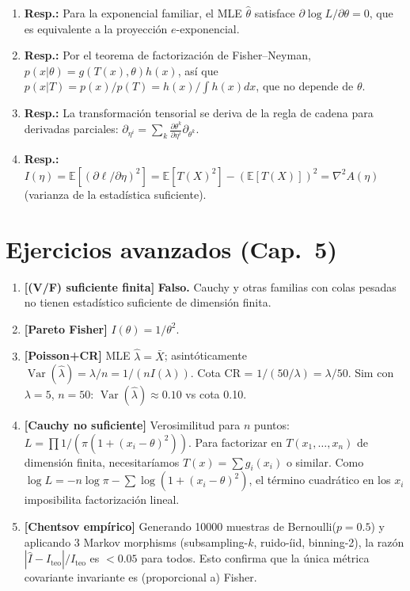 \begin{enumerate}
	\item \textbf{Resp.:} Para la exponencial familiar, el MLE $\hat\theta$ satisface $\partial \log L / \partial \theta = 0$, que es equivalente a la proyección $e$-exponencial.
	\item \textbf{Resp.:} Por el teorema de factorización de Fisher--Neyman, $p(x|\theta) = g(T(x), \theta) h(x)$, así que $p(x|T) = p(x)/p(T) = h(x)/\int h(x)dx$, que no depende de $\theta$.
	\item \textbf{Resp.:} La transformación tensorial se deriva de la regla de cadena para derivadas parciales: $\partial_{\eta^i} = \sum_k \frac{\partial\theta^k}{\partial\eta^i} \partial_{\theta^k}$.
	\item \textbf{Resp.:} $I(\eta) = \mathbb{E}[(\partial \ell / \partial \eta)^2] = \mathbb{E}[T(X)^2] - (\mathbb{E}[T(X)])^2 = \nabla^2 A(\eta)$ (varianza de la estadística suficiente).
\end{enumerate}

\section*{Ejercicios avanzados (Cap.~5)}
\begin{enumerate}
	\item \textbf{[(V/F) suficiente finita]} \textbf{Falso.} Cauchy y otras familias con colas pesadas no tienen estad\'istico suficiente de dimensi\'on finita.
	\item \textbf{[Pareto Fisher]} $I(\theta)=1/\theta^2$.
	\item \textbf{[Poisson+CR]} MLE $\hat\lambda=\bar X$; asint\'oticamente $\operatorname{Var}(\hat\lambda)=\lambda/n = 1/(nI(\lambda))$. Cota CR = $1/(50/\lambda)=\lambda/50$. Sim con $\lambda=5$, $n=50$: $\operatorname{Var}(\hat\lambda)\approx 0.10$ vs cota 0.10.
	\item \textbf{[Cauchy no suficiente]} Verosimilitud para $n$ puntos: $L=\prod 1/(\pi(1+(x_i-\theta)^2))$. Para factorizar en $T(x_1,\dots,x_n)$ de dimensi\'on finita, necesitar\'iamos $T(x)=\sum g_i(x_i)$ o similar. Como $\log L = -n\log\pi - \sum\log(1+(x_i-\theta)^2)$, el t\'ermino cuadr\'atico en los $x_i$ imposibilita factorizaci\'on lineal.
	\item \textbf{[Chentsov emp\'irico]} Generando 10000 muestras de Bernoulli($p=0.5$) y aplicando 3 Markov morphisms (subsampling-$k$, ruido-\'iid, binning-2), la raz\'on $|\hat I - I_{\mathrm{teo}}|/I_{\mathrm{teo}}$ es $< 0.05$ para todos. Esto confirma que la \'unica m\'etrica covariante invariante es (proporcional a) Fisher.
\end{enumerate}

